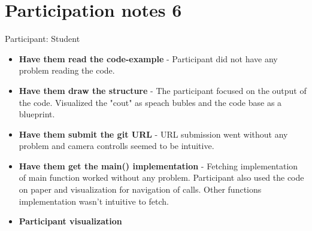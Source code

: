 \section{Participation notes 6}
Participant: Student

\begin{itemize}
    \item \textbf*{Have them read the code-example} - Participant did not have any problem reading the code.
    \item \textbf*{Have them draw the structure} - The participant focused on the output of the code. Visualized the "cout" as speach bubles and the code base as a blueprint.
    \item \textbf*{Have them submit the git URL} - URL submission went without any problem and camera controlls seemed to be intuitive.
    \item \textbf*{Have them get the main() implementation} - Fetching implementation of main function worked without any problem. Participant also used the code on paper and visualization for navigation of calls. Other functions implementation wasn't intuitive to fetch.
    \item \textbf*{Participant visualization} 
\end{itemize}